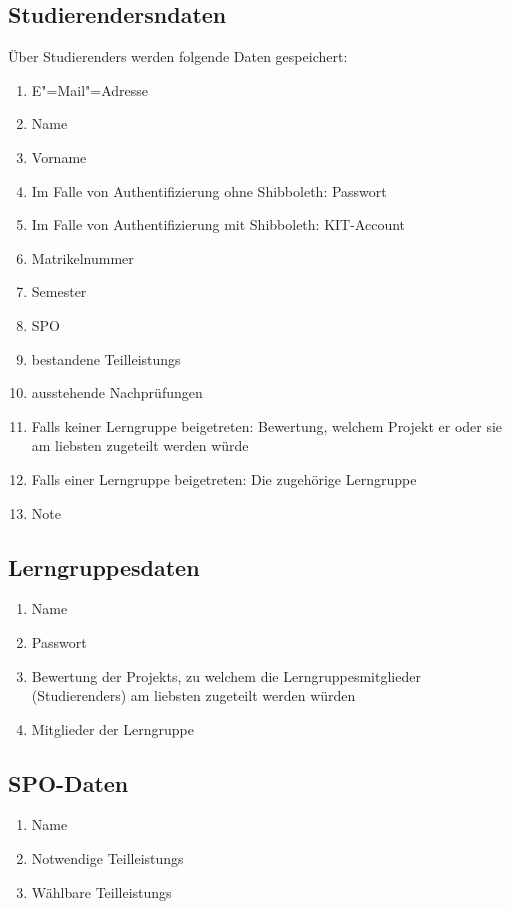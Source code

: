 \documentclass[parskip=full]{scrartcl}
\newcommand{\swtLabel}[1]{\textbf{/#1\arabic*0/}}
\begin{document}
\subsection{\glspl{Studierender}ndaten} 
Über \glspl{Studierender} werden folgende Daten gespeichert:
\begin{enumerate}[label=\swtLabel{D}, resume] 
  \item E"=Mail"=Adresse \label{SDatenAnfang}
  \item Name
  \item Vorname
  \item Im Falle von Authentifizierung ohne \gls{Shibboleth}: Passwort
  \item Im Falle von Authentifizierung mit \gls{Shibboleth}: \gls{KIT-Account}
  \item \gls{Matrikelnummer}
  \item Semester
  \item \gls{SPO}
  \item bestandene \glspl{Teilleistung} 
  \item ausstehende Nachprüfungen \label{SDatenEnde}
  
  \item Falls keiner \gls{Lerngruppe} beigetreten: \gls{Bewertung}, welchem \gls{Projekt} er oder
  sie am liebsten zugeteilt werden würde
  \item Falls einer \gls{Lerngruppe} beigetreten: Die zugehörige
  \gls{Lerngruppe}
  \item Note
\end{enumerate}
\subsection{\glspl{Lerngruppe}daten} 
\begin{enumerate}[label=\swtLabel{D}, resume] 
  \item Name
  \item Passwort
  \item \gls{Bewertung} der \glspl{Projekt}, zu welchem die \glspl{Lerngruppe}mitglieder
  (\glspl{Studierender}) am liebsten zugeteilt werden würden
  \item Mitglieder der \gls{Lerngruppe}
\end{enumerate}

\subsection{\gls{SPO}-Daten}
\begin{enumerate}[label=\swtLabel{D}, resume]
	\item Name
	\item Notwendige \glspl{Teilleistung}
	\item Wählbare \glspl{Teilleistung}
\end{enumerate}
\end{document}
